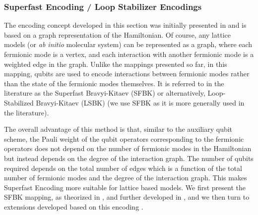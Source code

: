 \subsubsection{Superfast Encoding / Loop Stabilizer Encodings} \label{sec:superfast_encoding}
The encoding concept developed in this section was initially presented in \cite{Bravyi2002} and is based on a graph representation of the Hamiltonian. Of course, any lattice models (or \textit{ab initio} molecular system) can be represented as a graph, where each fermionic mode is a vertex, and each interaction with another fermionic mode is a weighted edge in the graph. Unlike the mappings presented so far, in this mapping, qubits are used to encode interactions between fermionic modes rather than the state of the fermionic modes themselves. It is referred to in the literature as the Superfast Bravyi-Kitaev (SFBK) or alternatively, Loop-Stabilized Bravyi-Kitaev (LSBK) \cite{Havlek2017} (we use SFBK as it is more generally used in the literature).

The overall advantage of this method is that, similar to the auxiliary qubit scheme, the Pauli weight of the qubit operators corresponding to the fermionic operators does not depend on the number of fermionic modes in the Hamiltonian but instead depends on the degree of the interaction graph. The number of qubits required depends on the total number of edges which is a function of the total number of fermionic modes and the degree of the interaction graph. This makes Superfast Encoding more suitable for lattice based models. We first present the SFBK mapping, as theorized in \cite{Bravyi2002}, and further developed in \cite{Whitfield2016, Havlek2017, Setia2018}, and we then turn to extensions developed based on this encoding \cite{Setia2019, Jiang2019, Derby2021, Derby2021_part2}.

